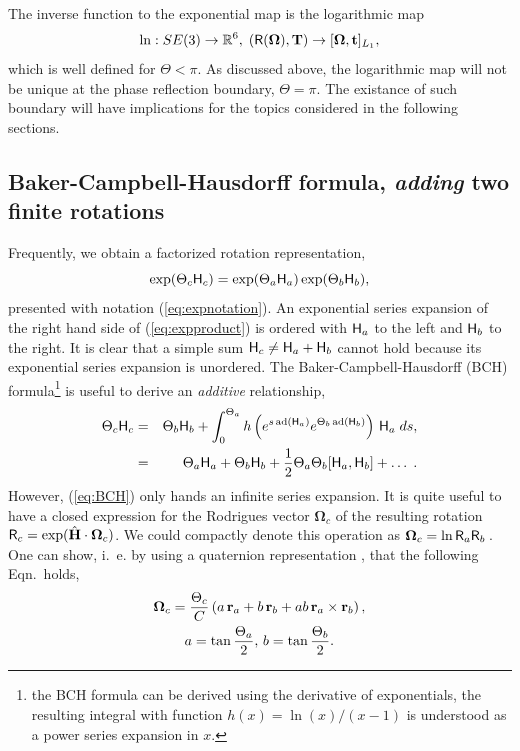 \documentclass[conference]{IEEEtran}
\newcommand{\real}{\Bbb R}
\newcommand{\bfOmega}{\boldsymbol{\Omega}}
\newcommand{\adj}[1]{\mathrm{ad}({#1})}
\newcommand{\beq}{\begin{equation}}
\newcommand{\eeq}{\end{equation}}
\newcommand{\beqar}{\begin{eqnarray}}
\newcommand{\eeqar}{\end{eqnarray}}
\begin{document}
\begin{appendix}
The inverse function to the exponential map is the logarithmic map
\beq
    \ln: SE(3)\rightarrow\real^6,\; ({\sf R}(\bfOmega),{\bf T})\rightarrow [\bfOmega,{\bf t}]_{L_1},
    \label{eq:logarithmicmap}
\eeq
which is well defined for $\Theta<\pi$. As discussed above, the logarithmic map will not be
unique at the phase reflection boundary, $\Theta = \pi$. The existance of such boundary will have
implications for the topics considered in the following sections.

\subsection{Baker-Campbell-Hausdorff formula, {\em adding} two finite rotations}
Frequently, we obtain a factorized rotation representation,
\beq
    \exp( \Theta_c {\sf H}_c ) = \exp(\Theta_a {\sf H}_a)\exp(\Theta_b{\sf H}_b),
    \label{eq:expproduct}
\eeq
presented with notation (\ref{eq:expnotation}). An exponential series expansion of the right hand side of
(\ref{eq:expproduct}) is ordered with ${\sf H}_a$ to the left and ${\sf H}_b$ to the right. It is clear
that a simple sum ${\sf H}_c \neq {\sf H}_a + {\sf H}_b$ cannot hold because its exponential series expansion is unordered. The Baker-Campbell-Hausdorff (BCH) formula\footnote{the BCH formula can be derived using
the derivative of exponentials, the resulting integral with function $h(x)=\ln(x)/(x-1)$ is understood as a power series expansion in $x$.} is useful to derive an {\em additive} relationship,
\beqar
    \Theta_c {\sf H}_c &=& \Theta_b {\sf H}_b + \int_0^{\Theta_a} h\left(
    e^{s \, \adj{{\sf H}_a}} e^{ \Theta_b \, \adj{{\sf H}_b}}
    \right) \, {\sf H}_a \; ds, \nonumber \\
    &=& \Theta_a {\sf H}_a + \Theta_b {\sf H}_b + {1\over 2}\Theta_a\Theta_b
    [{\sf H}_a,{\sf H}_b]+
    \ldots\; . \label{eq:BCH}
\eeqar
However, (\ref{eq:BCH}) only hands an infinite series expansion. It is quite useful to have a closed expression for the Rodrigues vector $\bfOmega_c$ of the resulting rotation ${\sf R}_c = \exp( \hat{\bf H}\cdot\bfOmega_c )$. We could compactly denote this operation as $\bfOmega_c = \ln {\sf R}_a{\sf R}_b\,$. One can show, i.~e. by using a quaternion representation
\cite{myself}, that the following Eqn.~holds,
\begin{multline}
    \bfOmega_c = {\Theta_c\over C}\left(
    a \, {\bf r}_a + b \, {\bf r}_b + ab \, {\bf r}_a\times{\bf r}_b \right), \\
    a =\tan{\Theta_a\over 2},\, b=\tan{\Theta_b\over 2}
    \label{eq:addSO3finite}.

\end{multline}
\end{appendix}
\end{document}
